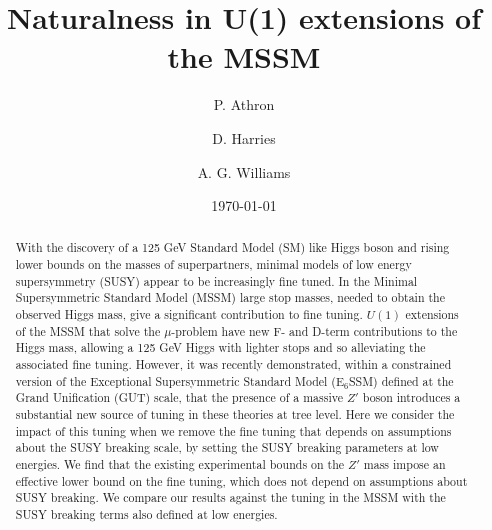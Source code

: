 \documentclass[preprint,amsmath,amssymb,aps,superscriptaddress,prd,showpacs,floatfix,nofootinbib]{revtex4-1}
\begin{document}
\title{Naturalness in U(1) extensions of the MSSM}

\author{P. Athron}

\author{D. Harries}

\author{A. G. Williams}

\date{\today}%

\begin{abstract}
With the discovery of a 125 GeV Standard Model (SM) like Higgs boson
and rising lower bounds on the masses of superpartners, minimal models
of low energy supersymmetry (SUSY) appear to be increasingly fine
tuned. In the Minimal Supersymmetric Standard Model (MSSM) large stop
masses, needed to obtain the observed Higgs mass, give a significant
contribution to fine tuning. $U(1)$ extensions of the MSSM that solve
the $\mu$-problem have new F- and D-term contributions to the Higgs
mass, allowing a 125 GeV Higgs with lighter stops and so alleviating
the associated fine tuning. However, it was recently demonstrated,
within a constrained version of the Exceptional Supersymmetric
Standard Model (E$_6$SSM) defined at the Grand Unification (GUT)
scale, that the presence of a massive $Z'$ boson introduces a
substantial new source of tuning in these theories at tree level. Here
we consider the impact of this tuning when we remove the fine tuning
that depends on assumptions about the SUSY breaking scale, by setting
the SUSY breaking parameters at low energies. We find that the
existing experimental bounds on the $Z'$ mass impose an effective
lower bound on the fine tuning, which does not depend on assumptions
about SUSY breaking.  We compare our results against the tuning in the
MSSM with the SUSY breaking terms also defined at low energies.

\end{abstract}
\end{document}

